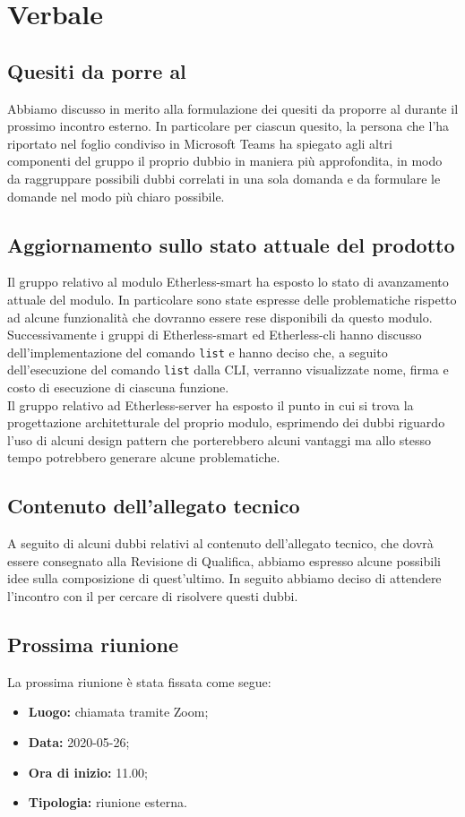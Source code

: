 \section{Verbale}
	\subsection{Quesiti da porre al \TV}
	Abbiamo discusso in merito alla formulazione dei quesiti da proporre al \TV{} durante il prossimo incontro esterno.
	In particolare per ciascun quesito, la persona che l'ha riportato nel foglio condiviso in Microsoft Teams\textit{} ha spiegato agli altri componenti del gruppo il proprio dubbio in maniera più approfondita, in modo da raggruppare possibili dubbi correlati in una sola domanda e da formulare le domande nel modo più chiaro possibile.
	
	\subsection{Aggiornamento sullo stato attuale del prodotto}
	Il gruppo relativo al modulo Etherless-smart ha esposto lo stato di avanzamento attuale del modulo.
	In particolare sono state espresse delle problematiche rispetto ad alcune funzionalità che dovranno essere rese disponibili da questo modulo. \\
	Successivamente i gruppi di Etherless-smart ed Etherless-cli hanno discusso dell'implementazione del comando \texttt{list} e hanno deciso che, a seguito dell'esecuzione del comando \texttt{list} dalla CLI\textit{}, verranno visualizzate nome, firma e costo di esecuzione di ciascuna funzione. \\
	Il gruppo relativo ad Etherless-server ha esposto il punto in cui si trova la progettazione architetturale del proprio modulo, esprimendo dei dubbi riguardo l'uso di alcuni design pattern che porterebbero alcuni vantaggi ma allo stesso tempo potrebbero generare alcune problematiche.
	
	\subsection{Contenuto dell'allegato tecnico}
	A seguito di alcuni dubbi relativi al contenuto dell'allegato tecnico, che dovrà essere consegnato alla Revisione di Qualifica, abbiamo espresso alcune possibili idee sulla composizione di quest'ultimo. In seguito abbiamo deciso di attendere l'incontro con il \RC{} per cercare di risolvere questi dubbi.
	
	\subsection{Prossima riunione}
		La prossima riunione è stata fissata come segue:
		\begin{itemize}
			\item \textbf{Luogo:} chiamata tramite Zoom; 
			\item \textbf{Data:} 2020-05-26;
			\item \textbf{Ora di inizio:} 11.00;
			\item \textbf{Tipologia:} riunione esterna.
		\end{itemize}